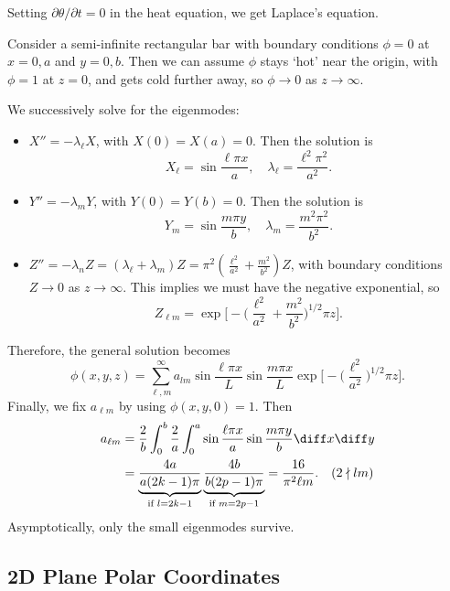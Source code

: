 \documentclass[12pt]{article}
\begin{document}
\begin{exbox}
	Setting $\partial \theta/\partial t = 0$ in the heat equation, we get Laplace's equation.

	Consider a semi-infinite rectangular bar with boundary conditions $\phi = 0$ at $x = 0, a$ and $y = 0, b$. Then we can assume $\phi$ stays `hot' near the origin, with $\phi = 1$ at $z = 0$, and gets cold further away, so $\phi \to 0$ as $z \to \infty$.

	We successively solve for the eigenmodes:
	\begin{itemize}
		\item $X'' = - \lambda_{\ell}X$, with $X(0) = X(a) = 0$. Then the solution is
			\[X_{\ell} = \sin \frac{\ell \pi x}{a}, \quad  \lambda_{\ell} = \frac{\ell^2 \pi^2}{a^2}.
			\]
		\item $Y'' = - \lambda_m Y$, with $Y(0) = Y(b) = 0$. Then the solution is
			\[Y_m = \sin \frac{m \pi y}{b}, \quad \lambda_m = \frac{m^2 \pi^2}{b^2}.\]

		\item $Z'' = -\lambda_nZ = (\lambda_\ell + \lambda_m)Z = \pi^2(\frac{\ell^2}{a^2} + \frac{m^2}{b^2})Z$, with boundary conditions $Z \to 0$ as $z \to \infty$. This implies we must have the negative exponential, so
			\[
				Z_{\ell m} = \exp \biggl[ - \biggl( \frac{\ell^2}{a^2} + \frac{m^2}{b^2} \biggr)^{1/2} \pi z \biggr]
			.\]
	\end{itemize}
	Therefore, the general solution becomes
	\[
		\phi(x, y, z) = \sum_{\ell, m}^{\infty}a_{lm} \sin \frac{\ell \pi x}{L} \sin \frac{m \pi x}{L} \exp \biggl[ - \biggl( \frac{\ell^2}{a^2} \biggr)^{1/2}\pi z \biggr]
	.\]
	Finally, we fix $a_{\ell m}$ by using $\phi(x, y, 0) = 1$. Then
	\begin{align*}
		a_{\ell m} &= \frac{2}{b} \int_{0}^{b} \frac{2}{a} \int_{0}^{a} \sin \frac{\ell \pi x}{a} \sin \frac{m \pi y}{b} \diff x \diff y \\
			   &= \underbrace{\frac{4a}{a(2k-1)\pi}}_{\text{if }l = 2k-1} \underbrace{\frac{4b}{b(2p-1)\pi}}_{\text{if }m = 2p-1} = \frac{16}{\pi^2\ell m}.\quad (2 \nmid lm)
	\end{align*}
	Asymptotically, only the small eigenmodes survive.
\end{exbox}

\subsection{2D Plane Polar Coordinates}%
\label{sub:2d_plane_polar_coordinates}
\end{document}
